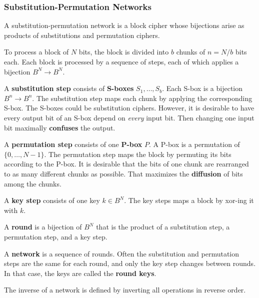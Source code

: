 \subsubsection{Substitution-Permutation Networks}

A substitution-permutation network is a block cipher whose bijections arise as products of substitutions and permutation ciphers.

To process a block of $N$ bits, the block is divided into $b$ chunks of $n=N/b$ bits each.
Each block is processed by a sequence of steps, each of which applies a bijection $B^N\to B^N$.

A \textbf{substitution step} consists of \textbf{S-boxes} $S_1,\ldots,S_b$.
Each S-box is a bijection $B^n\to B^n$.
The substitution step maps each chunk by applying the corresponding S-box.
The S-boxes could be substitution ciphers.
However, it is desirable to have every output bit of an S-box depend on \emph{every} input bit.
Then changing one input bit maximally \textbf{confuses} the output.

A \textbf{permutation step} consists of one \textbf{P-box} $P$.
A P-box is a permutation of $\{0,\ldots,N-1\}$.
The permutation step maps the block by permuting its bits according to the P-box.
It is desirable that the bits of one chunk are rearranged to as many different chunks as possible.
That maximizes the \textbf{diffusion} of bits among the chunks.

A \textbf{key step} consists of one key $k\in B^N$.
The key steps maps a block by xor-ing it with $k$.

A \textbf{round} is a bijection of $B^N$ that is the product of a substitution step, a permutation step, and a key step.

A \textbf{network} is a sequence of rounds.
Often the substitution and permutation steps are the same for each round, and only the key step changes between rounds.
In that case, the keys are called the \textbf{round keys}.

The inverse of a network is defined by inverting all operations in reverse order.


